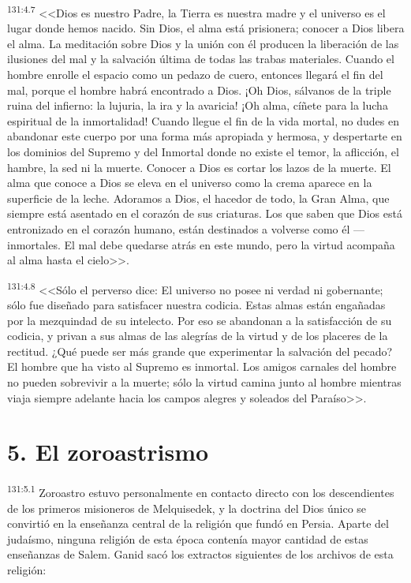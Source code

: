 \par 
\textsuperscript{131:4.7} <<Dios es nuestro Padre, la Tierra es nuestra madre y el universo es el lugar donde hemos nacido. Sin Dios, el alma está prisionera; conocer a Dios libera el alma. La meditación sobre Dios y la unión con él producen la liberación de las ilusiones del mal y la salvación última de todas las trabas materiales. Cuando el hombre enrolle el espacio como un pedazo de cuero, entonces llegará el fin del mal, porque el hombre habrá encontrado a Dios. ¡Oh Dios, sálvanos de la triple ruina del infierno: la lujuria, la ira y la avaricia! ¡Oh alma, cíñete para la lucha espiritual de la inmortalidad! Cuando llegue el fin de la vida mortal, no dudes en abandonar este cuerpo por una forma más apropiada y hermosa, y despertarte en los dominios del Supremo y del Inmortal donde no existe el temor, la aflicción, el hambre, la sed ni la muerte. Conocer a Dios es cortar los lazos de la muerte. El alma que conoce a Dios se eleva en el universo como la crema aparece en la superficie de la leche. Adoramos a Dios, el hacedor de todo, la Gran Alma, que siempre está asentado en el corazón de sus criaturas. Los que saben que Dios está entronizado en el corazón humano, están destinados a volverse como él ---inmortales. El mal debe quedarse atrás en este mundo, pero la virtud acompaña al alma hasta el cielo>>.

\par 
\textsuperscript{131:4.8} <<Sólo el perverso dice: El universo no posee ni verdad ni gobernante; sólo fue diseñado para satisfacer nuestra codicia. Estas almas están engañadas por la mezquindad de su intelecto. Por eso se abandonan a la satisfacción de su codicia, y privan a sus almas de las alegrías de la virtud y de los placeres de la rectitud. ¿Qué puede ser más grande que experimentar la salvación del pecado? El hombre que ha visto al Supremo es inmortal. Los amigos carnales del hombre no pueden sobrevivir a la muerte; sólo la virtud camina junto al hombre mientras viaja siempre adelante hacia los campos alegres y soleados del Paraíso>>.

\section*{5. El zoroastrismo}
\par 
\textsuperscript{131:5.1} Zoroastro estuvo personalmente en contacto directo con los descendientes de los primeros misioneros de Melquisedek, y la doctrina del Dios único se convirtió en la enseñanza central de la religión que fundó en Persia. Aparte del judaísmo, ninguna religión de esta época contenía mayor cantidad de estas enseñanzas de Salem. Ganid sacó los extractos siguientes de los archivos de esta religión:

